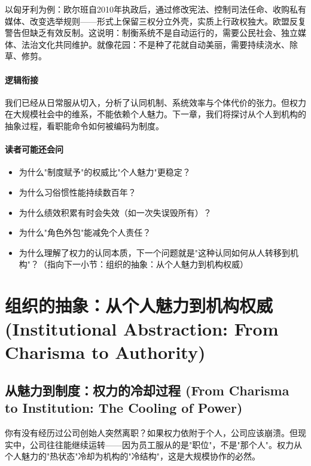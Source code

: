 \documentclass[../main.tex]{subfiles}
\begin{document}
	以匈牙利为例：欧尔班自2010年执政后，通过修改宪法、控制司法任命、收购私有媒体、改变选举规则——形式上保留三权分立外壳，实质上行政权独大。欧盟反复警告但缺乏有效反制。这说明：制衡系统不是自动运行的，需要公民社会、独立媒体、法治文化共同维护。就像花园：不是种了花就自动美丽，需要持续浇水、除草、修剪。

	\paragraph*{逻辑衔接}

	我们已经从日常服从切入，分析了认同机制、系统效率与个体代价的张力。但权力在大规模社会中的维系，不能依赖个人魅力。下一章，我们将探讨从个人到机构的抽象过程，看职能命令如何被编码为制度。
	
	\paragraph*{读者可能还会问}
	\begin{itemize}

	\item 为什么"制度赋予"的权威比"个人魅力"更稳定？

	\item 为什么习俗惯性能持续数百年？

	\item 为什么绩效积累有时会失效（如一次失误毁所有）？

	\item 为什么"角色外包"能减免个人责任？

	\item 为什么理解了权力的认同本质，下一个问题就是"这种认同如何从人转移到机构"？（指向下一小节：组织的抽象：从个人魅力到机构权威）
	\end{itemize}
	
	\section{组织的抽象：从个人魅力到机构权威 (Institutional Abstraction: From Charisma to Authority)}
	
	\subsection{从魅力到制度：权力的冷却过程 (From Charisma to Institution: The Cooling of Power)}
	
	\begin{motivation}

		你有没有经历过公司创始人突然离职？如果权力依附于个人，公司应该崩溃。但现实中，公司往往能继续运转——因为员工服从的是"职位"，不是"那个人"。权力从个人魅力的"热状态"冷却为机构的"冷结构"，这是大规模协作的必然。

	\end{motivation}
	
\end{document}
